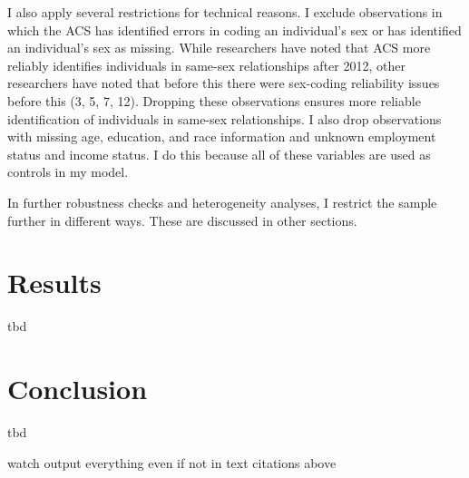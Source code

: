 \documentclass[12pt,letterpaper]{article}
\begin{document}
I also apply several restrictions for technical reasons. I exclude observations in which the ACS has identified errors in coding an individual’s sex or has identified an individual’s sex as missing. While researchers have noted that ACS more reliably identifies individuals in same-sex relationships after 2012, other researchers have noted that before this there were sex-coding reliability issues before this (3, 5, 7, 12). Dropping these observations ensures more reliable identification of individuals in same-sex relationships. I also drop observations with missing age, education, and race information and unknown employment status and income status. I do this because all of these variables are used as controls in my model.

\begin{landscape}

\end{landscape}

In further robustness checks and heterogeneity analyses, I restrict the sample further in different ways. These are discussed in other sections. 


\section{Results}
tbd
\section{Conclusion}
tbd

\newpage


watch output everything even if not in text citations above
\end{document}
